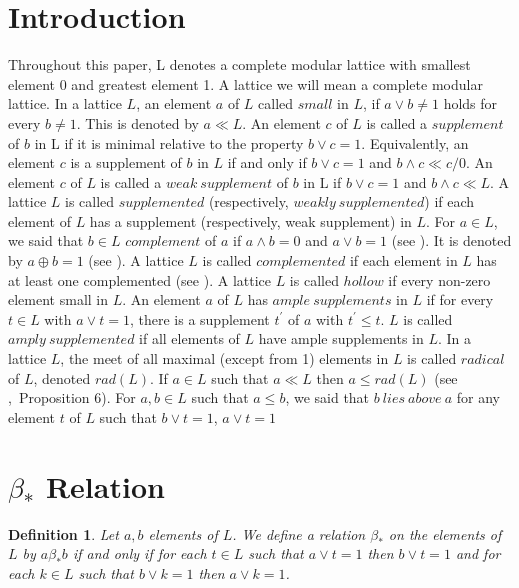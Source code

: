 \documentclass[a4paper,12pt]{article}
\newtheorem{definition}[theorem]{Definition}
\numberwithin{equation}{section}
\newcommand{\mycite}[2]{\textnormal{\cite{#1},~#2}}
\begin{document}
\section{Introduction}
Throughout this paper, L denotes a complete modular lattice with smallest element 0 and greatest element 1. A lattice we will mean a complete modular lattice. In a lattice $ L $, an element $ a $ of $ L $ 
called $ small $ in $ L $, if $ a \vee b \neq 1 $ holds for every $ b \neq 1 $. This is denoted by $ a \ll L $. An element $ c $ of $ L $ is called a $ supplement $ of $ b $ in L 
if it is minimal relative to the property $ b \vee c = 1 $. Equivalently, an element $ c $ is a supplement of $ b $ in $ L $ if and only if $ b \vee c = 1 $ and 
$ b \wedge c \ll c/0 $. An element $ c $ of $ L $ is called a $ weak \ supplement $ of $ b $ in L if $ b \vee c = 1 $ and $ b \wedge c \ll L $. A lattice $ L $ is called 
$ supplemented $ (respectively, $ weakly \ supplemented $) if each element of $ L $ has a supplement (respectively, weak supplement) in $ L $.
For $ a \in L $, we said that $ b \in L $ $ complement $ of $ a $ if $ a \wedge b = 0 $ and $ a \vee b = 1 $ (see \cite{davey}). It is denoted by $ a \oplus b = 1 $ (see \cite{calugeranu}). 
A lattice $ L $ is called $ complemented $ if each element in $ L $ has at least one complemented (see \cite{calugeranu}). A lattice $ L $ is called $ hollow $ if every non-zero element 
small in $ L $. An element $ a $ of $ L $ has $ ample \  supplements $ in $ L $ if for every $ t \in L $ with  $ a \vee t = 1 $, there is a supplement $ t^{'} $ of $ a $ with $ t^{'} \leq t $. 
$ L $ is called $ amply \ supplemented $ if all elements of $ L $ have ample supplements in $ L $. 
In a lattice $ L $, the meet of all maximal (except from 1) elements in $ L $ is called $ radical $ of $ L $, denoted $rad(L) $.  
If $ a \in L $ such that $ a \ll L $ then $ a \leq rad(L) $ (see \mycite{stenstrom}{Proposition 6}). 
For $ a,b \in L $ such that $ a \leq b $, we said that $ b \ lies \ above \ a $ for any element $ t $ of $ L $ such that $ b \vee t = 1 $, $ a \vee t = 1 $
\section{$ \beta_* $ Relation}
\begin{definition} \label{1}
  Let $ a,b $ elements of $ L $. We define a relation $ \beta_* $ on the elements of $ L $ by 
  $ a \beta_* b $ if and only if for each $ t \in L $ such that $ a \vee t = 1 $ then $ b \vee t = 1 $ and for each 
  $ k \in L $ such that $ b \vee k = 1 $ then $ a \vee k = 1 $. 

\end{definition}
\end{document}
